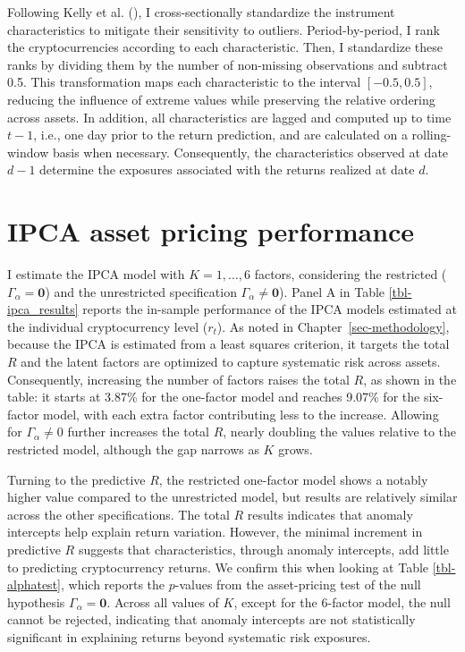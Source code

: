 \documentclass[
  12pt,
  a4paper,
  openany]{scrbook}
\begin{document}
Following Kelly et al.
(), I cross-sectionally
standardize the instrument characteristics to mitigate their sensitivity
to outliers. Period-by-period, I rank the cryptocurrencies according to
each characteristic. Then, I standardize these ranks by dividing them by
the number of non-missing observations and subtract 0.5. This
transformation maps each characteristic to the interval \([-0.5, 0.5]\),
reducing the influence of extreme values while preserving the relative
ordering across assets. In addition, all characteristics are lagged and
computed up to time \(t-1\), i.e., one day prior to the return
prediction, and are calculated on a rolling-window basis when necessary.
Consequently, the characteristics observed at date \(d-1\) determine the
exposures associated with the returns realized at date \(d\).

\section{IPCA asset pricing
performance}\label{ipca-asset-pricing-performance}

I estimate the IPCA model with \(K = 1, \dots, 6\) factors, considering
the restricted (\(\Gamma_\alpha = \mathbf{0}\)) and the unrestricted
specification \(\Gamma_\alpha \neq \mathbf{0}\)). Panel A in Table
\ref{tbl-ipca_results} reports the in-sample performance of the IPCA
models estimated at the individual cryptocurrency level (\(r_t\)). As
noted in Chapter~\ref{sec-methodology}, because the IPCA is estimated
from a least squares criterion, it targets the total \(R\) and the
latent factors are optimized to capture systematic risk across assets.
Consequently, increasing the number of factors raises the total \(R\),
as shown in the table: it starts at 3.87\% for the one-factor model and
reaches 9.07\% for the six-factor model, with each extra factor
contributing less to the increase. Allowing for \(\Gamma_\alpha \neq 0\)
further increases the total \(R\), nearly doubling the values relative
to the restricted model, although the gap narrows as \(K\) grows.

Turning to the predictive \(R\), the restricted one-factor model shows a
notably higher value compared to the unrestricted model, but results are
relatively similar across the other specifications. The total \(R\)
results indicates that anomaly intercepts help explain return variation.
However, the minimal increment in predictive \(R\) suggests that
characteristics, through anomaly intercepts, add little to predicting
cryptocurrency returns. We confirm this when looking at Table
\ref{tbl-alphatest}, which reports the \(p\)-values from the
asset-pricing test of the null hypothesis
\(\Gamma_\alpha = \mathbf{0}\). Across all values of \(K\), except for
the 6-factor model, the null cannot be rejected, indicating that anomaly
intercepts are not statistically significant in explaining returns
beyond systematic risk exposures.
\end{document}
